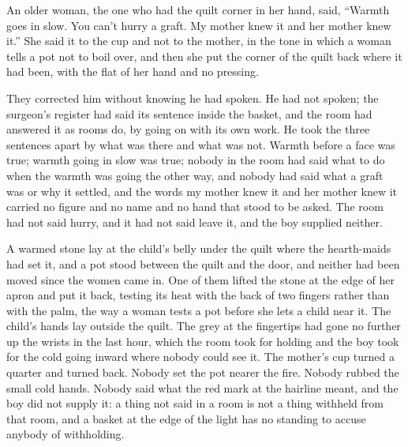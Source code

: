 An older woman, the one who had the quilt corner in her hand, said, “Warmth goes in slow. You can't hurry a graft. My mother knew it and her mother knew it.” She said it to the cup and not to the mother, in the tone in which a woman tells a pot not to boil over, and then she put the corner of the quilt back where it had been, with the flat of her hand and no pressing.

They corrected him without knowing he had spoken. He had not spoken; the surgeon's register had said its sentence inside the basket, and the room had answered it as rooms do, by going on with its own work. He took the three sentences apart by what was there and what was not. Warmth before a face was true; warmth going in slow was true; nobody in the room had said what to do when the warmth was going the other way, and nobody had said what a graft was or why it settled, and the words my mother knew it and her mother knew it carried no figure and no name and no hand that stood to be asked. The room had not said hurry, and it had not said leave it, and the boy supplied neither.

A warmed stone lay at the child's belly under the quilt where the hearth-maids had set it, and a pot stood between the quilt and the door, and neither had been moved since the women came in. One of them lifted the stone at the edge of her apron and put it back, testing its heat with the back of two fingers rather than with the palm, the way a woman tests a pot before she lets a child near it. The child's hands lay outside the quilt. The grey at the fingertips had gone no further up the wrists in the last hour, which the room took for holding and the boy took for the cold going inward where nobody could see it. The mother's cup turned a quarter and turned back. Nobody set the pot nearer the fire. Nobody rubbed the small cold hands. Nobody said what the red mark at the hairline meant, and the boy did not supply it: a thing not said in a room is not a thing withheld from that room, and a basket at the edge of the light has no standing to accuse anybody of withholding.

